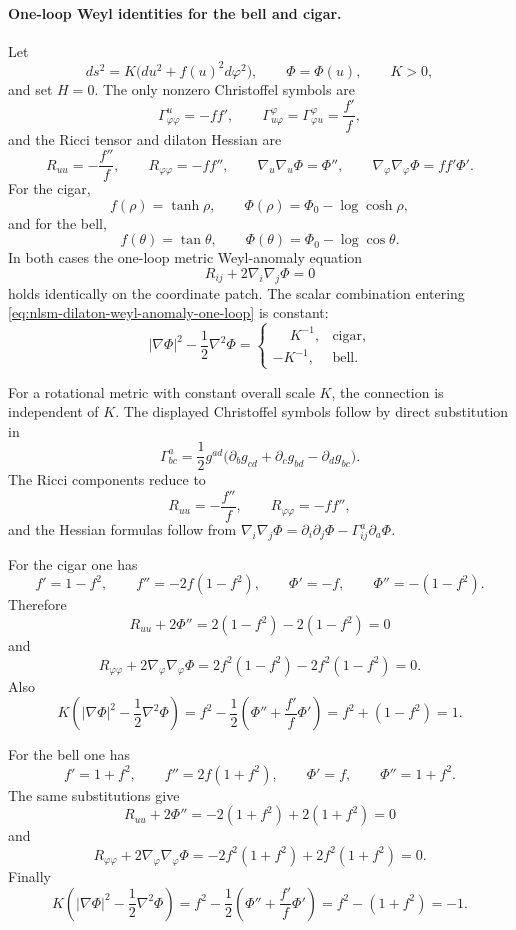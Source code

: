 \paragraph{One-loop Weyl identities for the bell and cigar.}
Let
\[
  ds^2=K\bigl(du^2+f(u)^2d\varphi^2\bigr),
  \qquad
  \Phi=\Phi(u),
  \qquad K>0,
\]
and set \(H=0\).  The only nonzero Christoffel symbols are
\[
  \Gamma^u_{\varphi\varphi}=-ff',
  \qquad
  \Gamma^\varphi_{u\varphi}=\Gamma^\varphi_{\varphi u}=\frac{f'}{f},
\]
and the Ricci tensor and dilaton Hessian are
\[
  R_{uu}=-\frac{f''}{f},
  \qquad
  R_{\varphi\varphi}=-ff'',
  \qquad
  \nabla_u\nabla_u\Phi=\Phi'',
  \qquad
  \nabla_\varphi\nabla_\varphi\Phi=ff'\Phi'.
\]
For the cigar,
\[
  f(\rho)=\tanh\rho,
  \qquad
  \Phi(\rho)=\Phi_0-\log\cosh\rho,
\]
and for the bell,
\[
  f(\theta)=\tan\theta,
  \qquad
  \Phi(\theta)=\Phi_0-\log\cos\theta .
\]
In both cases the one-loop metric Weyl-anomaly equation
\[
  R_{ij}+2\nabla_i\nabla_j\Phi=0
\]
holds identically on the coordinate patch.  The scalar combination entering
\eqref{eq:nlsm-dilaton-weyl-anomaly-one-loop} is constant:
\begin{equation}
  |\nabla\Phi|^2-\frac12\nabla^2\Phi
  =
  \begin{cases}
    \phantom{-}K^{-1}, & \text{cigar},\\
    -K^{-1}, & \text{bell}.
  \end{cases}
  \label{eq:bell-cigar-scalar-anomaly-constant}
\end{equation}

For a rotational metric with constant overall scale \(K\), the connection is
independent of \(K\).  The displayed Christoffel symbols follow by direct
substitution in
\[
  \Gamma^a_{bc}
  =
  \frac12g^{ad}
  \bigl(\partial_bg_{cd}+\partial_cg_{bd}-\partial_dg_{bc}\bigr).
\]
The Ricci components reduce to
\[
  R_{uu}=-\frac{f''}{f},
  \qquad
  R_{\varphi\varphi}=-ff'',
\]
and the Hessian formulas follow from
\(\nabla_i\nabla_j\Phi=\partial_i\partial_j\Phi-\Gamma^a_{ij}\partial_a\Phi\).

For the cigar one has
\[
  f' = 1-f^2,
  \qquad
  f''=-2f(1-f^2),
  \qquad
  \Phi'=-f,
  \qquad
  \Phi''=-(1-f^2).
\]
Therefore
\[
  R_{uu}+2\Phi''
  =
  2(1-f^2)-2(1-f^2)=0
\]
and
\[
  R_{\varphi\varphi}+2\nabla_\varphi\nabla_\varphi\Phi
  =
  2f^2(1-f^2)-2f^2(1-f^2)=0.
\]
Also
\[
  K\left(|\nabla\Phi|^2-\frac12\nabla^2\Phi\right)
  =
  f^2-\frac12\left(\Phi''+\frac{f'}{f}\Phi'\right)
  =
  f^2+(1-f^2)=1 .
\]

For the bell one has
\[
  f'=1+f^2,
  \qquad
  f''=2f(1+f^2),
  \qquad
  \Phi'=f,
  \qquad
  \Phi''=1+f^2.
\]
The same substitutions give
\[
  R_{uu}+2\Phi''
  =
  -2(1+f^2)+2(1+f^2)=0
\]
and
\[
  R_{\varphi\varphi}+2\nabla_\varphi\nabla_\varphi\Phi
  =
  -2f^2(1+f^2)+2f^2(1+f^2)=0.
\]
Finally
\[
  K\left(|\nabla\Phi|^2-\frac12\nabla^2\Phi\right)
  =
  f^2-\frac12\left(\Phi''+\frac{f'}{f}\Phi'\right)
  =
  f^2-(1+f^2)=-1 .
\]

